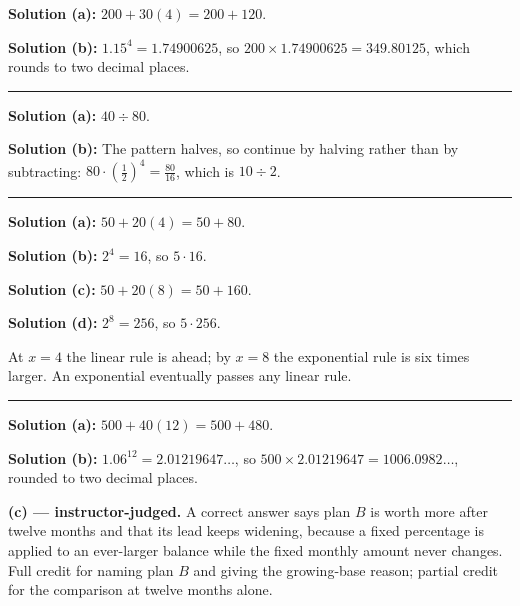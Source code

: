\documentclass[12pt]{article}
\begin{document}
\textbf{Solution (a):} $200 + 30(4) = 200 + 120$. 

\textbf{Solution (b):} $1.15^4 = 1.74900625$, so $200 \times 1.74900625 = 349.80125$, which rounds to two decimal places. 

\vspace{0.2cm}\noindent\rule{\linewidth}{0.2pt}


\textbf{Solution (a):} $40 \div 80$. 

\textbf{Solution (b):} The pattern halves, so continue by halving rather than by subtracting: $80 \cdot \left(\tfrac{1}{2}\right)^4 = \tfrac{80}{16}$, which is $10 \div 2$. 

\vspace{0.2cm}\noindent\rule{\linewidth}{0.2pt}


\textbf{Solution (a):} $50 + 20(4) = 50 + 80$. 

\textbf{Solution (b):} $2^4 = 16$, so $5 \cdot 16$. 

\textbf{Solution (c):} $50 + 20(8) = 50 + 160$. 

\textbf{Solution (d):} $2^8 = 256$, so $5 \cdot 256$. 

At $x = 4$ the linear rule is ahead; by $x = 8$ the exponential rule is six times larger. An exponential eventually passes any linear rule.

\vspace{0.2cm}\noindent\rule{\linewidth}{0.2pt}


\textbf{Solution (a):} $500 + 40(12) = 500 + 480$. 

\textbf{Solution (b):} $1.06^{12} = 2.01219647\ldots$, so $500 \times 2.01219647 = 1006.0982\ldots$, rounded to two decimal places. 

\textbf{(c) --- instructor-judged.} A correct answer says plan $B$ is worth more after twelve months and that its lead keeps widening, because a fixed percentage is applied to an ever-larger balance while the fixed monthly amount never changes. Full credit for naming plan $B$ and giving the growing-base reason; partial credit for the comparison at twelve months alone.
\end{document}
